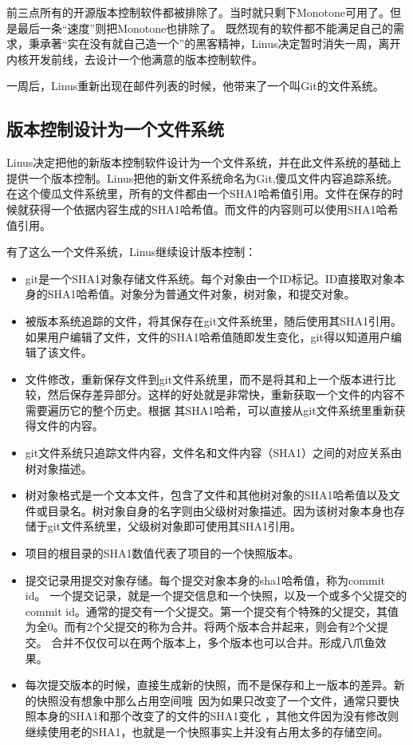 前三点所有的开源版本控制软件都被排除了。当时就只剩下Monotone可用了。但是最后一条“速度”则把Monotone也排除了。
既然现有的软件都不能满足自己的需求，秉承著“实在没有就自己造一个”的黑客精神，Linus决定暂时消失一周，离开内核开发前线，去设计一个他满意的版本控制软件。

一周后，Linus重新出现在邮件列表的时候，他带来了一个叫Git的文件系统。

\subsection{版本控制设计为一个文件系统}

Linus决定把他的新版本控制软件设计为一个文件系统，并在此文件系统的基础上提供一个版本控制。Linus把他的新文件系统命名为Git,傻瓜文件内容追踪系统。
在这个傻瓜文件系统里，所有的文件都由一个SHA1哈希值引用。文件在保存的时候就获得一个依据内容生成的SHA1哈希值。而文件的内容则可以使用SHA1哈希值引用。

有了这么一个文件系统，Linus继续设计版本控制：

\begin{itemize}
\item git是一个SHA1对象存储文件系统。每个对象由一个ID标记。ID直接取对象本身的SHA1哈希值。对象分为普通文件对象，树对象，和提交对象。
\item 被版本系统追踪的文件，将其保存在git文件系统里，随后使用其SHA1引用。如果用户编辑了文件，文件的SHA1哈希值随即发生变化，git得以知道用户编辑了该文件。
\item 文件修改，重新保存文件到git文件系统里，而不是将其和上一个版本进行比较，然后保存差异部分。这样的好处就是非常快，重新获取一个文件的内容不需要遍历它的整个历史。根据 其SHA1哈希，可以直接从git文件系统里重新获得文件的内容。
\item git文件系统只追踪文件内容，文件名和文件内容（SHA1）之间的对应关系由树对象描述。
\item 树对象格式是一个文本文件，包含了文件和其他树对象的SHA1哈希值以及文件或目录名。树对象自身的名字则由父级树对象描述。因为该树对象本身也存储于git文件系统里，父级树对象即可使用其SHA1引用。

\item 项目的根目录的SHA1数值代表了项目的一个快照版本。
\item 提交记录用提交对象存储。每个提交对象本身的sha1哈希值，称为commit id。 一个提交记录，就是一个提交信息和一个快照，以及一个或多个父提交的commit id。通常的提交有一个父提交。第一个提交有个特殊的父提交，其值为全0。而有2个父提交的称为合并。将两个版本合并起来，则会有2个父提交。
合并不仅仅可以在两个版本上，多个版本也可以合并。形成八爪鱼效果。
\item 每次提交版本的时候，直接生成新的快照，而不是保存和上一版本的差异。新的快照没有想象中那么占用空间哦~因为如果只改变了一个文件，通常只要快照本身的SHA1和那个改变了的文件的SHA1变化 ，其他文件因为没有修改则继续使用老的SHA1，也就是一个快照事实上并没有占用太多的存储空间。

\end{itemize}

